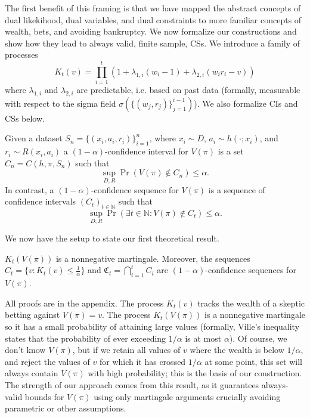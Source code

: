 The first benefit of this framing is that we have mapped the abstract concepts
of dual likekihood, dual variables, and dual constraints to more familiar
concepts of wealth, bets, and avoiding bankruptcy.  We now formalize our
constructions and show how they lead to always valid, finite sample, CSs. We
introduce a family of processes
\[
K_t(v) = \prod_{i=1}^t (1+\lambda_{1,i} (w_i-1) +\lambda_{2,i}(w_i r_i - v))
\]
where $\lambda_{1,i}$ and $\lambda_{2,i}$ are predictable, i.e. based on past data (formally, measurable with
respect to the sigma field $\sigma(\{(w_j,r_j)\}_{j=1}^{i-1})$).  We also formalize CIs and CSs below.
\begin{definition}
Given a dataset $S_n=\{(x_i,a_i,r_i)\}_{i=1}^n$, where 
$x_i \sim D$, $a_i\sim h(\cdot;x_i)$, and $r_i \sim R(x_i,a_i)$ 
a $(1-\alpha)$-confidence interval 
for $V(\pi)$ is a set $C_n = C(h,\pi,S_n)$ such that
\[
\sup_{D,R} \Pr(V(\pi) \notin C_n) \leq \alpha.
\]
In contrast, a $(1-\alpha)$-confidence sequence for $V(\pi)$ 
is a sequence of confidence intervals $(C_t)_{t \in \mathbb{N}}$ such that
\[
\sup_{D,R} \Pr(\exists t \in \mathbb{N}: V(\pi) \notin C_t) \leq \alpha.
\]
\end{definition}

We now have the setup to state our first theoretical result.
\begin{theorem}
\label{thm:martingale}
\label{thm:ville}
\label{thm:cs}
$K_t(V(\pi))$ is a nonnegative martingale. Moreover,
the sequences $C_t = \{v:K_t(v)\leq \frac{1}{\alpha}\}$ 
and $\mathfrak{C}_t = \bigcap_{i=1}^t C_i$
are $(1-\alpha)$-confidence sequences for $V(\pi)$.
\end{theorem}
All proofs are in the appendix.  
The process $K_t(v)$
tracks the wealth of a skeptic betting against $V(\pi)=v$. The process
$K_t(V(\pi))$ is a nonnegative martingale so it has a small probability of attaining large values (formally, Ville's inequality states that the probability of ever exceeding $1/\alpha$ is at most $\alpha$). 
Of course, we don't know $V(\pi)$, but if we retain all values of $v$ where the wealth is below $1/\alpha$, and reject the values of $v$ for which it has crossed $1/\alpha$ at some point, this set will always contain $V(\pi)$ with high probability; this is the basis of our construction.
The strength of our approach comes from this result, 
as it guarantees always-valid bounds for $V(\pi)$ using 
only martingale arguments crucially avoiding
parametric or other assumptions.

